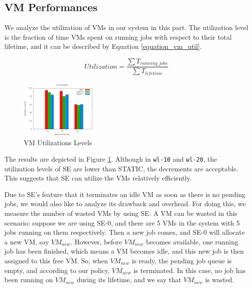 \subsection{VM Performances}
We analyze the utilization of VMs in our system in this part. The utilization level is the fraction of time VMs spent on running jobs with respect to their total lifetime, and it can be described by Equation \ref{equation_vm_util}.

\begin{equation}
\label{equation_vm_util}
Utilization = \frac{\sum{T_{running\_jobs}}}{\sum{T_{lifetime}}}
\end{equation}

\begin{figure}[!t]
\centering
\includegraphics[width=0.35\textwidth]{pictures/vm-util.png}
\caption{VM Utilizations Levels}
\label{figure_vm_util}
\end{figure}

The results are depicted in Figure \ref{figure_vm_util}. Although in \texttt{wl-10} and \texttt{wl-20}, the utilization levels of SE are lower than STATIC, the decrements are acceptable. This suggests that SE can utilize the VMs relatively efficiently.

Due to SE's feature that it terminates an idle VM as soon as there is no pending jobs, we would also like to analyze its drawback and overhead. For doing this, we measure the number of wasted VMs by using SE. A VM can be wasted in this scenario: suppose we are using SE-0, and there are 5 VMs in the system with 5 jobs running on them respectively. Then a new job comes, and SE-0 will allocate a new VM, say $VM_{new}$. However, before $VM_{new}$ becomes available, one running job has been finished, which means a VM becomes idle, and this new job is then assigned to this free VM. So, when $VM_{new}$ is ready, the pending job queue is empty, and according to our policy, $VM_{new}$ is terminated. In this case, no job has been running on $VM_{new}$ during its lifetime, and we say that $VM_{new}$ is wasted.

